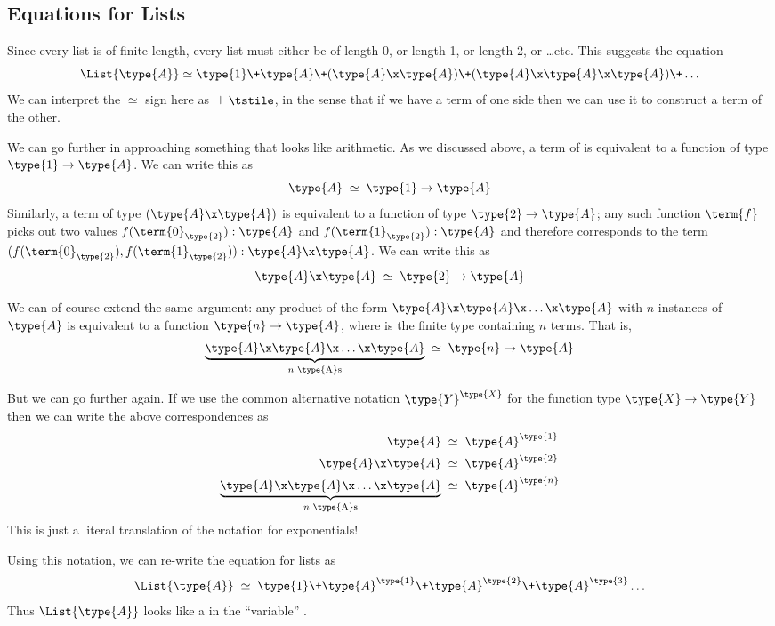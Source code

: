 \subsection{Equations for Lists}

Since every list is of finite length, every list must either be of length 0, or length 1, or length 2, or \ldots etc.  This suggests the equation
\[
\List{\type{A}} \simeq \type{1} \+ \type{A} \+ (\type{A} \x \type{A}) \+ (\type{A} \x \type{A} \x \type{A}) \+ \ldots
\]
We can interpret the $\simeq$ sign here as $\dashv \; \tstile$, in the sense that if we have a term of one side then we can use it to construct a term of the other.

We can go further in approaching something that looks like arithmetic.  As we discussed above, a term of  is equivalent to a function of type $\type{1} \to \type{A}$.  We can write this as 
\[
\type{A} \;\simeq\; \type{1} \to \type{A}
\]
Similarly, a term of type $(\type{A} \x \type{A})$ is equivalent to a function of type $\type{2} \to \type{A}$; any such function $\term{f}$ picks out two values 
$f(\term{0}_{\type{2}}):\type{A}$ and 
$f(\term{1}_{\type{2}}):\type{A}$ and therefore corresponds to the term 
$(f(\term{0}_{\type{2}}),
f(\term{1}_{\type{2}})): \type{A} \x \type{A}$.  We can write this as
\[
\type{A} \x \type{A} \;\simeq\; \type{2} \to \type{A}
\]

We can of course extend the same argument: any product of the form 
$\type{A} \x \type{A} \x \ldots \x \type{A}$ with $n$ instances of $\type{A}$ is equivalent to a function $\type{n} \to \type{A}$, where  is the finite type containing $n$ terms.  That is,
\[
\underbrace{\type{A} \x \type{A} \x \ldots \x \type{A}}_\text{$n$ \type{A}s} 
\;\simeq\; \type{n} \to \type{A}
\]

But we can go further again.  If we use the common alternative notation $\type{Y}^{\type{X}}$ for the function type $\type{X} \to \type{Y}$ then we can write the above correspondences as
\begin{align*}
\type{A} \;&\simeq\; \type{A}^{\type{1}}
\\
\type{A} \x \type{A} \;&\simeq\; 
\type{A}^{\type{2}}
\\
\underbrace{\type{A} \x \type{A} \x \ldots \x \type{A}}_\text{$n$ \type{A}s} 
\;&\simeq\; 
\type{A}^{\type{n}}
\end{align*}
This is just a literal translation of the notation for exponentials!

Using this notation, we can re-write the equation for lists as
\[
\List{\type{A}} 
\;\simeq\;
\type{1} \+ \type{A}^{\type{1}} \+ \type{A}^{\type{2}} \+ \type{A}^{\type{3}} \ldots
\]
Thus $\List{\type{A}}$ looks like a  in the ``variable'' .


